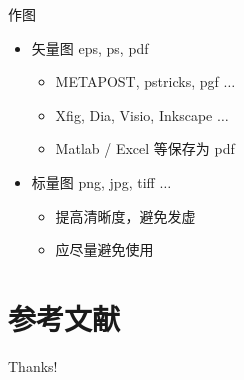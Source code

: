 \documentclass{beamer}
\begin{document}
\begin{frame}{作图}
    \begin{itemize}
        \item 矢量图 eps, ps, pdf
        \begin{itemize}
            \item METAPOST, pstricks, pgf $\ldots$
            \item Xfig, Dia, Visio, Inkscape $\ldots$
            \item Matlab / Excel 等保存为 pdf
        \end{itemize}
        \item 标量图 png, jpg, tiff $\ldots$
        \begin{itemize}
            \item 提高清晰度，避免发虚
            \item 应尽量避免使用
        \end{itemize}
    \end{itemize}
\end{frame}

\section{参考文献}

\begin{frame}[allowframebreaks]
    
    
\end{frame}

\begin{frame}
    \begin{center}
        {\Huge Thanks!}
    \end{center}
\end{frame}
\end{document}
